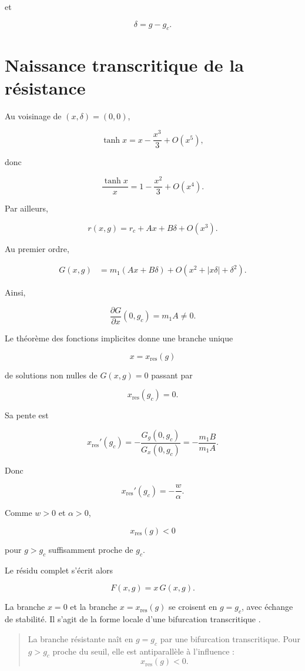 et

\[
\delta=g-g_c.
\]

\section{Naissance transcritique de la résistance}
\label{annexe-resistance-transcritique}

Au voisinage de \((x,\delta)=(0,0)\),

\[
\tanh x
=
x-\frac{x^3}{3}+O(x^5),
\]

donc

\[
\frac{\tanh x}{x}
=
1-\frac{x^2}{3}+O(x^4).
\]

Par ailleurs,

\[
r(x,g)
=
r_c
+
Ax
+
B\delta
+
O(x^3).
\]

Au premier ordre,

\[
\begin{aligned}
G(x,g)
&=
m_1(Ax+B\delta)
+
O\left(
x^2+|x\delta|+\delta^2
\right).
\end{aligned}
\]

Ainsi,

\[
\frac{\partial G}{\partial x}(0,g_c)
=
m_1A
\neq0.
\]

Le théorème des fonctions implicites donne une branche unique

\[
x=x_{\mathrm{res}}(g)
\]

de solutions non nulles de \(G(x,g)=0\) passant par

\[
x_{\mathrm{res}}(g_c)=0.
\]

Sa pente est

\[
x_{\mathrm{res}}'(g_c)
=
-
\frac{G_g(0,g_c)}
{G_x(0,g_c)}
=
-
\frac{m_1B}{m_1A}.
\]

Donc

\[
\boxed{
x_{\mathrm{res}}'(g_c)
=
-\frac{w}{\alpha}.
}
\]

Comme \(w>0\) et \(\alpha>0\),

\[
x_{\mathrm{res}}(g)<0
\]

pour \(g>g_c\) suffisamment proche de \(g_c\).

Le résidu complet s'écrit alors

\[
F(x,g)
=
x\,G(x,g).
\]

La branche \(x=0\) et la branche
\(x=x_{\mathrm{res}}(g)\) se croisent en \(g=g_c\), avec échange de
stabilité. Il s'agit de la forme locale d'une bifurcation
transcritique \cite{kuznetsov2004elements}.

\begin{quote}
La branche résistante naît en \(g=g_c\) par une bifurcation
transcritique. Pour \(g>g_c\) proche du seuil, elle est
antiparallèle à l'influence :
\[
x_{\mathrm{res}}(g)<0.
\]
\end{quote}

